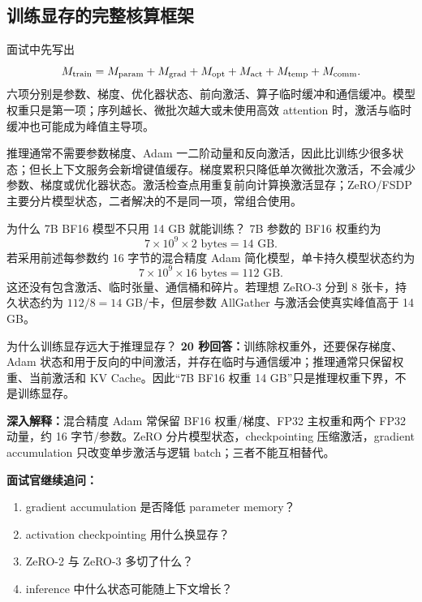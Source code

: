 \subsection{训练显存的完整核算框架}

面试中先写出
\[
M_{\rm train}=
M_{\rm param}+M_{\rm grad}+M_{\rm opt}
+M_{\rm act}+M_{\rm temp}+M_{\rm comm}.
\]
六项分别是参数、梯度、优化器状态、前向激活、算子临时缓冲和通信缓冲。模型权重只是第一项；序列越长、微批次越大或未使用高效 attention 时，激活与临时缓冲也可能成为峰值主导项。

推理通常不需要参数梯度、Adam 一二阶动量和反向激活，因此比训练少很多状态；但长上下文服务会新增键值缓存。梯度累积只降低单次微批次激活，不会减少参数、梯度或优化器状态。激活检查点用重复前向计算换激活显存；ZeRO/FSDP 主要分片模型状态，二者解决的不是同一项，常组合使用。

\begin{exercisebox}{为什么 7B BF16 模型不只用 14 GB 就能训练？}
7B 参数的 BF16 权重约为
\[
7\times10^9\times2\text{ bytes}=14\text{ GB}.
\]
若采用前述每参数约 16 字节的混合精度 Adam 简化模型，单卡持久模型状态约为
\[
7\times10^9\times16\text{ bytes}=112\text{ GB}.
\]
这还没有包含激活、临时张量、通信桶和碎片。若理想 ZeRO-3 分到 8 张卡，持久状态约为 $112/8=14$ GB/卡，但层参数 AllGather 与激活会使真实峰值高于 14 GB。
\end{exercisebox}

\begin{interviewbox}{为什么训练显存远大于推理显存？}
\textbf{20 秒回答：}训练除权重外，还要保存梯度、Adam 状态和用于反向的中间激活，并存在临时与通信缓冲；推理通常只保留权重、当前激活和 KV Cache。因此“7B BF16 权重 14 GB”只是推理权重下界，不是训练显存。

\textbf{深入解释：}混合精度 Adam 常保留 BF16 权重/梯度、FP32 主权重和两个 FP32 动量，约 16 字节/参数。ZeRO 分片模型状态，checkpointing 压缩激活，gradient accumulation 只改变单步激活与逻辑 batch；三者不能互相替代。

\textbf{面试官继续追问：}
\begin{enumerate}
  \item gradient accumulation 是否降低 parameter memory？
  \item activation checkpointing 用什么换显存？
  \item ZeRO-2 与 ZeRO-3 多切了什么？
  \item inference 中什么状态可能随上下文增长？
\end{enumerate}
\end{interviewbox}

